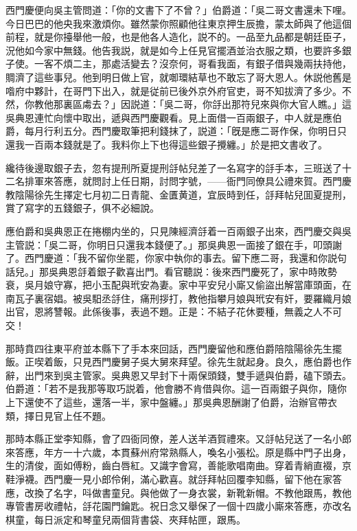 西門慶便向吳主管問道：「你的文書下了不曾？」伯爵道：「吳二哥文書還未下哩。今日巴巴的他央我來激煩你。雖然蒙你照顧他往東京押生辰擔，蒙太師與了他這個前程，就是你擡舉他一般，也是他各人造化，説不的。一品至九品都是朝廷臣子，況他如今家中無錢。他告我説，就是如今上任見官擺酒並治衣服之類，也要許多銀子使。一客不煩二主，那處活變去？沒奈何，哥看我面，有銀子借與幾兩扶持他，賙濟了這些事兒。他到明日做上官，就啣環結草也不敢忘了哥大恩人。休説他舊是喒府中夥計，在哥門下出入，就是従前已後外京外府官吏，哥不知拔濟了多少。不然，你教他那裏區䖏去？」因説道：「吳二哥，你㧱出那符兒來與你大官人瞧。」這吳典恩連忙向懷中取出，遞與西門慶觀看。見上面借一百兩銀子，中人就是應伯爵，每月行利五分。西門慶取筆把利錢抹了，説道：「旣是應二哥作保，你明日只還我一百兩本錢就是了。我料你上下也得這些銀子攪纏。」於是把文書收了。

纔待後邊取銀子去，忽有提刑所夏提刑㧱帖兒差了一名寫字的㧱手本，三班送了十二名排軍來答應，就問討上任日期，討問字號，——衙門同僚具公禮來賀。西門慶教陰陽徐先生擇定七月初二日青龍、金匱黄道，宜辰時到任，㧱拜帖兒囬夏提刑，賞了寫字的五錢銀子，俱不必細說。

應伯爵和吳典恩正在捲棚内坐的，只見陳經濟㧱着一百兩銀子出來，西門慶交與吳主管説：「吳二哥，你明日只還我本錢便了。」那吳典恩一面接了銀在手，叩頭謝了。西門慶道：「我不留你坐罷，你家中執你的事去。留下應二哥，我還和你説句話兒。」那吳典恩㧱着銀子歡喜出門。看官聽説：後來西門慶死了，家中時敗勢衰，吳月娘守寡，把小玉配與玳安為妻。家中平安兒小廝又偷盜出解當庫頭面，在南瓦子裏宿娼。被吳馹丞㧱住，痛刑拶打，教他指攀月娘與玳安有奸，要羅織月娘出官，恩將讐報。此係後事，表過不題。正是：不結子花休要種，無義之人不可交！

那時賁四往東平府並本縣下了手本來回話，西門慶留他和應伯爵陪陰陽徐先生擺飯。正喫着飯，只見西門慶舅子吳大舅來拜望。徐先生就起身。良久，應伯爵也作辭，出門來到吳主管家。吳典恩又早封下十兩保頭錢，雙手遞與伯爵，磕下頭去。伯爵道：「若不是我那等取巧説着，他會勝不肯借與你。這一百兩銀子與你，隨你上下還使不了這些，還落一半，家中盤纏。」那吳典恩酬謝了伯爵，治辦官帶衣類，擇日見官上任不題。

那時本縣正堂李知縣，會了四衙同僚，差人送羊酒賀禮來。又㧱帖兒送了一名小郎來答應，年方一十六歲，本貫蘇州府常熟縣人，喚名小張松。原是縣中門子出身，生的清俊，面如傅粉，齒白唇紅。又識字會寫，善能歌唱南曲。穿着青綃直裰，京鞋淨襪。西門慶一見小郎伶俐，滿心歡喜。就㧱拜帖回覆李知縣，留下他在家答應，改換了名字，呌做書童兒。與他做了一身衣裳，新靴新帽。不教他跟馬，教他專管書房收禮帖，㧱花園門鑰匙。祝日念又舉保了一個十四歲小廝來答應，亦改名棋童，每日派定和琴童兒兩個背書袋、夾拜帖匣，跟馬。

